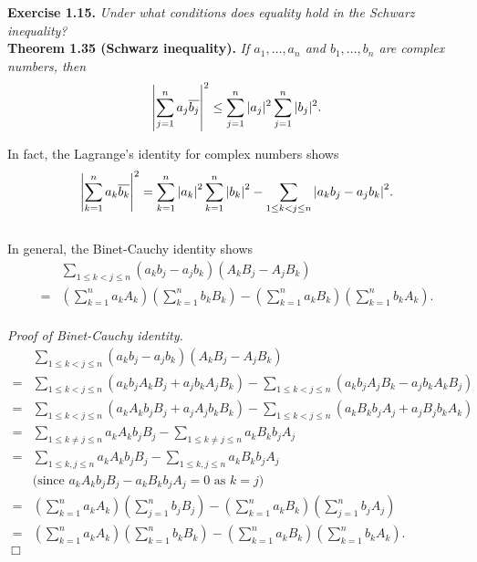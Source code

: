 \documentclass{article}
\begin{document}



\textbf{Exercise 1.15.}
\emph{Under what conditions does equality hold in the Schwarz inequality?} \\

\textbf{Theorem 1.35 (Schwarz inequality).}
\emph{If $a_1, \ldots, a_n$ and $b_1, \ldots, b_n$ are complex numbers, then
$$\abs{\sum_{j=1}^n a_j \overline{b_j}}^2
\leq \sum_{j=1}^n |a_j|^2 \sum_{j=1}^n|b_j|^2.$$}

In fact, the Lagrange's identity for complex numbers shows
$$\abs{ \sum_{k=1}^{n} a_k \overline{b_k} }^2
= \sum_{k=1}^{n} \abs{a_k}^2 \sum_{k=1}^{n} \abs{b_k}^2
- \sum_{1 \leq k < j \leq n}
\abs{ a_k b_j - a_j b_k }^2.$$ \\

In general, the Binet-Cauchy identity shows
\begin{align*}
&\sum_{1 \leq k < j \leq n}
(a_k b_j - a_j b_k)(A_k B_j - A_j B_k) \\
= &\left( \sum_{k=1}^{n} a_k A_k \right)\left( \sum_{k=1}^{n} b_k B_k \right)
- \left( \sum_{k=1}^{n} a_k B_k \right)\left( \sum_{k=1}^{n} b_k A_k \right).
\end{align*} \\

\emph{Proof of Binet-Cauchy identity.}
\begin{align*}
&\sum_{1 \leq k < j \leq n}
(a_k b_j - a_j b_k)(A_k B_j - A_j B_k) \\
= &\sum_{1 \leq k < j \leq n}
(a_k b_j A_k B_j + a_j b_k A_j B_k)
- \sum_{1 \leq k < j \leq n}
(a_k b_j A_j B_k - a_j b_k A_k B_j) \\
= &\sum_{1 \leq k < j \leq n}
(a_k A_k b_j B_j + a_j A_j b_k B_k)
- \sum_{1 \leq k < j \leq n}
(a_k B_k b_j A_j + a_j B_j b_k A_k) \\
= &\sum_{1 \leq k \neq j \leq n} a_k A_k b_j B_j
 - \sum_{1 \leq k \neq j \leq n} a_k B_k b_j A_j \\
= &\sum_{1 \leq k, j \leq n} a_k A_k b_j B_j
 - \sum_{1 \leq k, j \leq n} a_k B_k b_j A_j \\
  & \text{(since $a_k A_k b_j B_j - a_k B_k b_j A_j = 0$ as $k = j$)} \\
= &\left( \sum_{k=1}^{n} a_k A_k \right)\left( \sum_{j=1}^{n} b_j B_j \right)
- \left( \sum_{k=1}^{n} a_k B_k \right)\left( \sum_{j=1}^{n} b_j A_j \right) \\
= &\left( \sum_{k=1}^{n} a_k A_k \right)\left( \sum_{k=1}^{n} b_k B_k \right)
- \left( \sum_{k=1}^{n} a_k B_k \right)\left( \sum_{k=1}^{n} b_k A_k \right).
\end{align*}
$\Box$ \\
\end{document}
